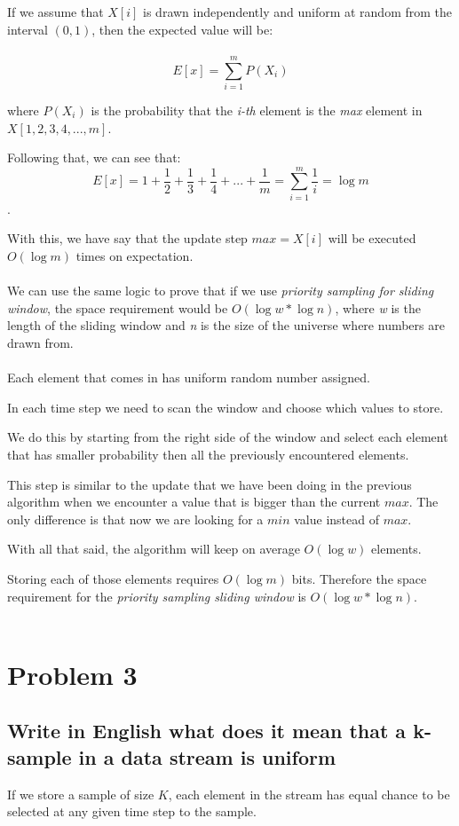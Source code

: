 \documentclass[11pt]{article}
\begin{document}
If we assume that $ X[i] $ is drawn independently and uniform at random from the interval $ (0,1) $, then the expected value will be:
\\~\\
$$ E \left[x\right] = \sum_{i=1}^m P(X_i) $$

where $ P(X_i) $ is the probability that the \textit{i-th} element is the \textit{max} element in $ X \left[ 1,2,3,4,...,m \right] $.

Following that, we can see that:
$$ E \left [ x \right ] = 1+\frac{1}{2}+\frac{1}{3}+\frac{1}{4}+...+\frac{1}{m} = \sum_{i=1}^m \frac{1}{i} = \log m $$.

With this, we have say that the update step $ max=X[i] $ will be executed $ O(\log m) $ times on expectation.
\\~\\
We can use the same logic to prove that if we use \textit{priority sampling for sliding window}, the space requirement would be $ O(\log w* \log n) $, where \textit{w} is the length of the sliding window and \textit{n} is the size of the universe where numbers are drawn from.
\\~\\
Each element that comes in has uniform random number assigned.

In each time step we need to scan the window and choose which values to store.

We do this by starting from the right side of the window and select each element that has smaller probability then all the previously encountered elements.

This step is similar to the update that we have been doing in the previous algorithm when we encounter a value that is bigger than the current $max$.
The only difference is that now we are looking for a $min$ value instead of $max$.

With all that said, the algorithm will keep on average $O(\log w)$ elements.

Storing each of those elements requires $O(\log m)$ bits. Therefore the space requirement for the \textit{priority sampling sliding window} is $ O(\log w* \log n) $.
\\~\\
\section{Problem 3}
\subsection{Write in English what does it mean that a k-sample in a data stream is uniform}
If we store a sample of size $K$, each element in the stream has equal chance to be selected at any given time step to the sample.
\end{document}
